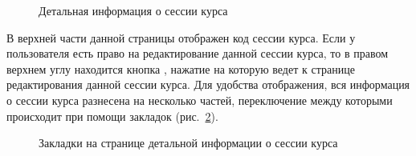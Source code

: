 	\begin{figure}[H]
		\caption{Детальная информация о сессии курса}
		\label{img:course_session:course_sessions_detail}
	\end{figure}
	
	В верхней части данной страницы отображен код сессии курса. Если у пользователя есть право на редактирование данной сессии курса, то в правом верхнем углу находится кнопка , нажатие на которую ведет к странице редактирования данной сессии курса. Для удобства отображения, вся информация о сессии курса разнесена на несколько частей, переключение между которыми происходит при помощи закладок (рис.~\ref{img:course_session:course_sessions_tabs}).
	\begin{figure}[H]
		\caption{Закладки на странице детальной информации о сессии курса}
		\label{img:course_session:course_sessions_tabs}
	\end{figure}
	
